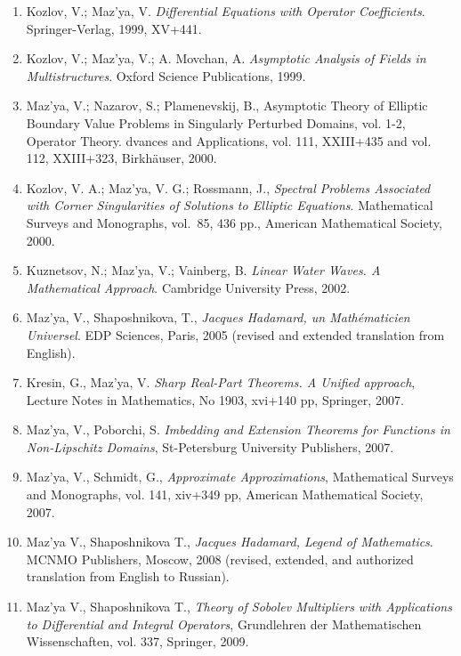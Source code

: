 \documentclass{article}
\begin{document}
\begin{enumerate}
\item Kozlov, V.;  Maz'ya, V. {\it  Differential Equations with
Operator
Coefficients}. Springer-Verlag, 1999, XV+441.

\item Kozlov, V.; Maz'ya, V.; A. Movchan, A. {\it Asymptotic Analysis
of
Fields in Multistructures}. Oxford Science Publications, 1999.

\item Maz'ya, V.; Nazarov, S.; Plamenevskij, B.,
Asymptotic Theory of Elliptic Boundary Value
Problems in Singularly Perturbed Domains, vol. 1-2, Operator Theory.
dvances and
Applications, vol. 111, XXIII+435 and vol. 112, XXIII+323,
Birkh\"auser, 2000.

\item Kozlov, V. A.; Maz'ya, V. G.; Rossmann, J.,
   {\it Spectral Problems Associated with
     Corner Singularities of Solutions to Elliptic Equations}.
     Mathematical Surveys and
       Monographs, vol.~85, 436 pp., American Mathematical Society,
2000.

\item Kuznetsov, N.; Maz'ya, V.; Vainberg, B. {\it Linear
Water Waves. A Mathematical Approach}. Cambridge University
Press, 2002.

\item Maz'ya, V., Shaposhnikova, T.,
{\it Jacques Hadamard, un Math\'ematicien Universel}. EDP Sciences, Paris, 2005
(revised and extended translation from English).

\item Kresin, G., Maz'ya, V.
{\it Sharp Real-Part Theorems. A Unified approach}, Lecture Notes in Mathematics, No 1903, xvi+140 pp, Springer, 2007.

\item Maz'ya, V., Poborchi, S.
{\it Imbedding and Extension Theorems for Functions in Non-Lipschitz Domains}, St-Petersburg University Publishers, 2007.


\item Maz'ya, V., Schmidt, G., {\it Approximate Approximations}, Mathematical Surveys and Monographs, vol. 141,  xiv+349 pp, American Mathematical Society, 2007.

\item Maz'ya V., Shaposhnikova T., {\it Jacques Hadamard, Legend of  Mathematics}. MCNMO Publishers, Moscow, 2008 (revised,  extended, and  authorized translation from English to Russian).



\item Maz'ya V., Shaposhnikova T., {\it Theory of Sobolev Multipliers with Applications to Differential and Integral Operators}, Grundlehren der Mathematischen Wissenschaften, vol. 337, Springer, 2009.


\end{enumerate}
\end{document}
